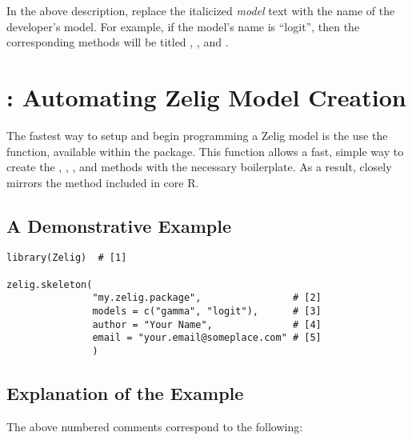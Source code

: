 In the above description, replace the italicized \emph{model} text with the name of the developer's model. For example, if the model's name is ``logit'', then the corresponding methods will be titled , , and .



\section{: Automating Zelig Model Creation}\label{zelig.skeleton}

The fastest way to setup and begin programming a Zelig model is the use the  function, available within the  package. This function allows a fast, simple way to create the , , , and  methods with the necessary boilerplate. As a result,  closely mirrors the  method included in core R.

\subsection{A Demonstrative Example}

\begin{verbatim}
library(Zelig)  # [1]

zelig.skeleton(
               "my.zelig.package",                # [2]
               models = c("gamma", "logit"),      # [3]
               author = "Your Name",              # [4]
               email = "your.email@someplace.com" # [5]
               )
\end{verbatim}

\subsection{Explanation of the  Example}

The above numbered comments correspond to the following:

